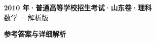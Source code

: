 \documentclass[zihao=-4, a4paper]{ctexart}
\begin{document}
\begin{center}
  {\Large\bfseries 2010 年·普通高等学校招生考试·山东卷·理科}\\[4pt]
  {\large 数学 · 解析版}
\end{center}
\medskip
{}

\clearpage
{}
\begin{center}{\Large\bfseries 参考答案与详细解析}\end{center}
\medskip

\end{document}
